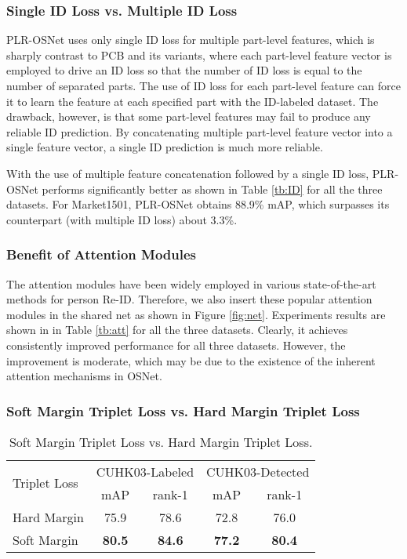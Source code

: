 \documentclass[journal]{IEEEtran}
\begin{document}
\subsubsection{Single ID Loss vs. Multiple ID Loss}
PLR-OSNet uses only single ID loss for multiple part-level features, which is sharply contrast to PCB and its variants, where each part-level feature vector is employed to drive an ID loss so that the number of ID loss is equal to the number of separated parts. The use of ID loss for each part-level feature can force it to learn the feature at each specified part with the ID-labeled dataset. The drawback, however, is that some part-level features may fail to produce any reliable ID prediction. By concatenating multiple part-level feature vector into a single feature vector, a single ID prediction is much more reliable.

With the use of multiple feature concatenation followed by a single ID loss, PLR-OSNet performs significantly better as shown in Table \ref{tb:ID} for all the three datasets.  For Market1501, PLR-OSNet obtains 88.9\% mAP, which surpasses its counterpart (with multiple ID loss) about 3.3\%.

\subsubsection{Benefit of Attention Modules}
The attention modules have been widely employed in various state-of-the-art methods for person Re-ID. Therefore, we also insert these popular attention modules in the shared net as shown in Figure \ref{fig:net}. Experiments results are shown in in Table \ref{tb:att} for all the three datasets. Clearly, it achieves consistently improved performance for all three datasets. However, the improvement is moderate, which may be due to the existence of the inherent attention mechanisms in OSNet.

\subsubsection{Soft Margin Triplet Loss vs. Hard Margin Triplet Loss}
\begin{table}
\begin{center}
\label{my-label}
\begin{tabular}{l|c@{\hskip 5pt}c@{\hskip 5pt}|c@{\hskip 5pt}c@{\hskip 5pt}}
\toprule[1.5pt]
\multirow{2}{*}{Triplet Loss}  &   \multicolumn{2}{c|}{CUHK03-Labeled}	&	\multicolumn{2}{c}{CUHK03-Detected}			\\
\cline{2-5}
	 &	mAP 	&	rank-1	&	mAP 	&	rank-1	\\
\hline\hline
Hard Margin &	75.9	&	78.6	& 72.8 & 76.0	\\
\hline
Soft Margin &	\textbf{80.5}	&	\textbf{84.6}	& \textbf{77.2}	& \textbf{80.4}	\\
\bottomrule[1.5pt]
\end{tabular}
\end{center}
\caption{Soft Margin Triplet Loss vs. Hard Margin Triplet Loss.}
\label{tb:softHard}
\end{table}
\end{document}
